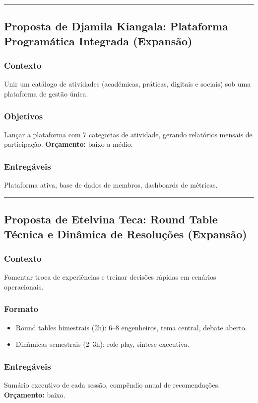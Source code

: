 \documentclass[12pt,a4paper]{article}
\newcommand{\proposalsep}{%
  \vspace{6pt}%
  {\color{gold}\rule{0.35\linewidth}{0.7pt}}%
  \vspace{4pt}%
}
\begin{document}
\proposalsep

\subsection{Proposta de Djamila Kiangala: Plataforma Programática Integrada (Expansão)}

\subsubsection*{Contexto}
Unir um catálogo de atividades (académicas, práticas, digitais e sociais) sob uma plataforma de gestão única.

\subsubsection*{Objetivos}
Lançar a plataforma com 7 categorias de atividade, gerando relatórios mensais de participação. \textbf{Orçamento:} baixo a médio.

\subsubsection*{Entregáveis}
Plataforma ativa, base de dados de membros, dashboards de métricas.

\proposalsep

\subsection{Proposta de Etelvina Teca: Round Table Técnica e Dinâmica de Resoluções (Expansão)}

\subsubsection*{Contexto}
Fomentar troca de experiências e treinar decisões rápidas em cenários operacionais.

\subsubsection*{Formato}
\begin{itemize}
    \item Round tables bimestrais (2h): 6–8 engenheiros, tema central, debate aberto.
    \item Dinâmicas semestrais (2–3h): role-play, síntese executiva.
\end{itemize}

\subsubsection*{Entregáveis}
Sumário executivo de cada sessão, compêndio anual de recomendações. \textbf{Orçamento:} baixo.
\end{document}
